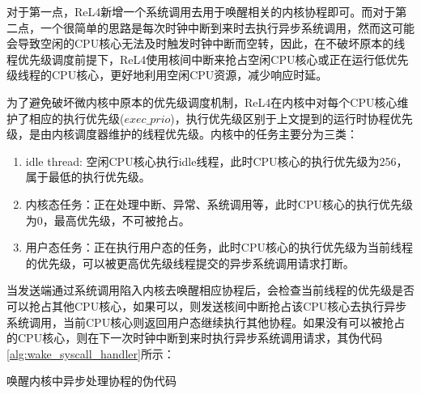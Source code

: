 对于第一点，ReL4新增一个系统调用去用于唤醒相关的内核协程即可。而对于第二点，一个很简单的思路是每次时钟中断到来时去执行异步系统调用，然而这可能会导致空闲的CPU核心无法及时触发时钟中断而空转，因此，在不破坏原本的线程优先级调度前提下，ReL4使用核间中断来抢占空闲CPU核心或正在运行低优先级线程的CPU核心，更好地利用空闲CPU资源，减少响应时延。

为了避免破坏微内核中原本的优先级调度机制，ReL4在内核中对每个CPU核心维护了相应的执行优先级($exec\_prio$)，执行优先级区别于上文提到的运行时协程优先级，是由内核调度器维护的线程优先级。内核中的任务主要分为三类：
\begin{enumerate}
  \item idle thread: 空闲CPU核心执行idle线程，此时CPU核心的执行优先级为256，属于最低的执行优先级。
  \item 内核态任务：正在处理中断、异常、系统调用等，此时CPU核心的执行优先级为0，最高优先级，不可被抢占。
  \item 用户态任务：正在执行用户态的任务，此时CPU核心的执行优先级为当前线程的优先级，可以被更高优先级线程提交的异步系统调用请求打断。
\end{enumerate}


当发送端通过系统调用陷入内核去唤醒相应协程后，会检查当前线程的优先级是否可以抢占其他CPU核心，如果可以，则发送核间中断抢占该CPU核心去执行异步系统调用，当前CPU核心则返回用户态继续执行其他协程。如果没有可以被抢占的CPU核心，则在下一次时钟中断到来时执行异步系统调用请求，其伪代码\ref{alg:wake_syscall_handler}所示：


\begin{algorithm}[H]
    \caption{唤醒内核中异步处理协程的伪代码}\label{alg:wake_syscall_handler}
\end{algorithm}
